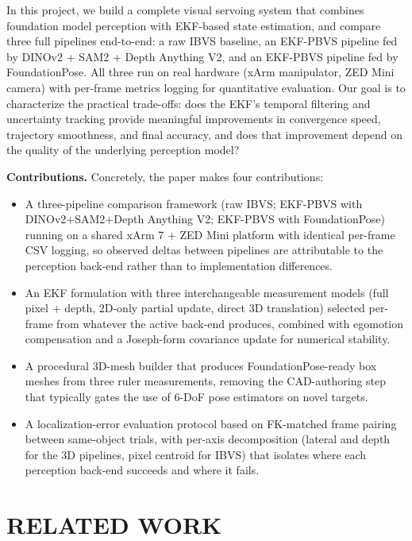\documentclass[letterpaper, 10 pt, conference]{ieeeconf}  %
\begin{document}
In this project, we build a complete visual servoing system that combines foundation model perception with EKF-based state estimation, and compare three full pipelines end-to-end: a raw IBVS baseline, an EKF-PBVS pipeline fed by DINOv2 + SAM2 + Depth Anything V2, and an EKF-PBVS pipeline fed by FoundationPose. All three run on real hardware (xArm manipulator, ZED Mini camera) with per-frame metrics logging for quantitative evaluation. Our goal is to characterize the practical trade-offs: does the EKF's temporal filtering and uncertainty tracking provide meaningful improvements in convergence speed, trajectory smoothness, and final accuracy, and does that improvement depend on the quality of the underlying perception model?

\textbf{Contributions.} Concretely, the paper makes four contributions:
\begin{itemize}
    \item A three-pipeline comparison framework (raw IBVS; EKF-PBVS with DINOv2+SAM2+Depth Anything V2; EKF-PBVS with FoundationPose) running on a shared xArm 7 + ZED Mini platform with identical per-frame CSV logging, so observed deltas between pipelines are attributable to the perception back-end rather than to implementation differences.
    \item An EKF formulation with three interchangeable measurement models (full pixel + depth, 2D-only partial update, direct 3D translation) selected per-frame from whatever the active back-end produces, combined with egomotion compensation and a Joseph-form covariance update for numerical stability.
    \item A procedural 3D-mesh builder that produces FoundationPose-ready box meshes from three ruler measurements, removing the CAD-authoring step that typically gates the use of 6-DoF pose estimators on novel targets.
    \item A localization-error evaluation protocol based on FK-matched frame pairing between same-object trials, with per-axis decomposition (lateral and depth for the 3D pipelines, pixel centroid for IBVS) that isolates where each perception back-end succeeds and where it fails.
\end{itemize}


\section{RELATED WORK}
\end{document}
